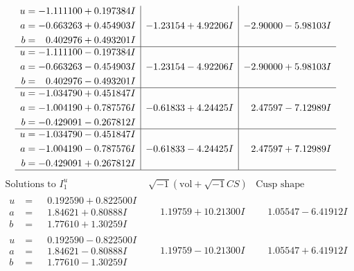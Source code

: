 \documentclass[1p]{elsarticle_modified}
\theoremstyle{definition}
\newcommand{\I}{\sqrt{-1}}
\begin{document}
$$\begin{array}{c|c|c}
\begin{aligned}
u &= -1.111100 + 0.197384 I \\
a &= -0.663263 + 0.454903 I \\
b &= \phantom{-}0.402976 + 0.493201 I\end{aligned}
 & -1.23154 + 4.92206 I & -2.90000 - 5.98103 I \\ \hline\begin{aligned}
u &= -1.111100 - 0.197384 I \\
a &= -0.663263 - 0.454903 I \\
b &= \phantom{-}0.402976 - 0.493201 I\end{aligned}
 & -1.23154 - 4.92206 I & -2.90000 + 5.98103 I \\ \hline\begin{aligned}
u &= -1.034790 + 0.451847 I \\
a &= -1.004190 + 0.787576 I \\
b &= -0.429091 - 0.267812 I\end{aligned}
 & -0.61833 + 4.24425 I & \phantom{-}2.47597 - 7.12989 I \\ \hline\begin{aligned}
u &= -1.034790 - 0.451847 I \\
a &= -1.004190 - 0.787576 I \\
b &= -0.429091 + 0.267812 I\end{aligned}
 & -0.61833 - 4.24425 I & \phantom{-}2.47597 + 7.12989 I\\
 \hline 
 \end{array}$$\newpage$$\begin{array}{c|c|c}  
\text{Solutions to }I^u_{1}& \I (\text{vol} + \sqrt{-1}CS) & \text{Cusp shape}\\
 \hline 
\begin{aligned}
u &= \phantom{-}0.192590 + 0.822500 I \\
a &= \phantom{-}1.84621 + 0.80888 I \\
b &= \phantom{-}1.77610 + 1.30259 I\end{aligned}
 & \phantom{-}1.19759 + 10.21300 I & \phantom{-}1.05547 - 6.41912 I \\ \hline\begin{aligned}
u &= \phantom{-}0.192590 - 0.822500 I \\
a &= \phantom{-}1.84621 - 0.80888 I \\
b &= \phantom{-}1.77610 - 1.30259 I\end{aligned}
 & \phantom{-}1.19759 - 10.21300 I & \phantom{-}1.05547 + 6.41912 I \\ \hline\begin{aligned}

\end{aligned}
\end{array}$$
\end{document}
